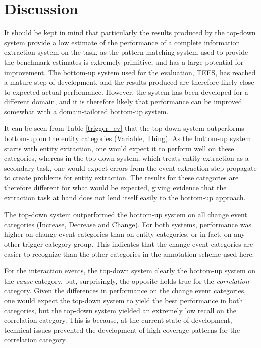 \section{Discussion}

It should be kept in mind that particularly the results produced by the top-down system provide a low estimate of the performance of a complete information extraction system on the task, as the pattern matching system used to provide the benchmark estimates is extremely primitive, and has a large potential for improvement. The bottom-up system used for the evaluation, TEES, has reached a mature step of development, and the results produced are therefore likely close to expected actual performance. However, the system has been developed for a different domain, and it is therefore likely that performance can be improved somewhat with a domain-tailored bottom-up system.


It can be seen from Table \ref{trigger_ev} that the top-down system outperforms bottom-up on the entity categories (Variable, Thing). As the bottom-up system starts with entity extraction, one would expect it to perform well on these categories, whereas in the top-down system, which treats entity extraction as a secondary task, one would expect errors from the event extraction step propagate to create problems for entity extraction. The results for these categories are therefore different for what would be expected, giving evidence that the extraction task at hand does not lend itself easily to the bottom-up approach. 

The top-down system outperformed the bottom-up system on all change event categories (Increase, Decrease and Change). For both systems, performance was higher on change event categories than on entity categories, or in fact, on any other trigger category group. This indicates that the change event categories are easier to recognize than the other categories in the annotation scheme used here.

For the interaction events, the top-down system clearly the bottom-up system on the \emph{cause} category, but, surprisingly, the opposite holds true for the \emph{correlation} category. Given the differences in performance on the change event categories, one would expect the top-down system to yield the best performance in both categories, but the top-down system yielded an extremely low recall on the correlation category. This is because, at the current state of development, technical issues prevented the development of high-coverage patterns for the correlation category. 


